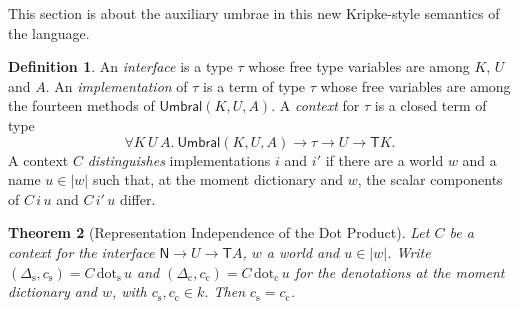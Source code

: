 \documentclass[11pt,a4paper]{report}
\theoremstyle{plain}
\newtheorem{theorem}{Theorem}[chapter]
\theoremstyle{definition}
\newtheorem{definition}[theorem]{Definition}
\theoremstyle{remark}
\newcommand{\Umbral}{\mathsf{Umbral}}
\newcommand{\T}{\mathsf{T}}
\newcommand{\Nat}{\mathsf{N}}
\begin{document}
This section is about the auxiliary umbrae in this new Kripke-style semantics of 
the language.

\begin{definition}
\label{def:interface}
An \emph{interface} is a type $\tau$ whose free type variables are among $K$,
$U$ and $A$. An \emph{implementation} of $\tau$ is a term of type $\tau$ whose
free variables are among the fourteen methods of $\Umbral(K, U, A)$. A
\emph{context} for $\tau$ is a closed term of type
\[
  \forall K\,U\,A.\ \Umbral(K, U, A) \to \tau \to U \to \T K .
\]
A context $C$ \emph{distinguishes} implementations $i$ and $i'$ if there are a
world $w$ and a name $u \in |w|$ such that, at the moment dictionary and $w$, the
scalar components of $C\,i\,u$ and $C\,i'\,u$ differ.
\end{definition}

\begin{theorem}[Representation Independence of the Dot Product]
\label{thm:repind}
Let $C$ be a context for the interface $\Nat \to U \to \T A$, $w$ a world and $u \in |w|$. Write
$(\Delta_{\mathrm{s}}, c_{\mathrm{s}}) = C\,\mathrm{dot}_{\mathrm{s}}\, u$ and
$(\Delta_{\mathrm{c}}, c_{\mathrm{c}}) = C\,\mathrm{dot}_{\mathrm{c}}\, u$ for
the denotations at the moment dictionary and $w$, with
$c_{\mathrm{s}}, c_{\mathrm{c}} \in k$. Then $c_{\mathrm{s}} = c_{\mathrm{c}}$.
\end{theorem}
\end{document}
